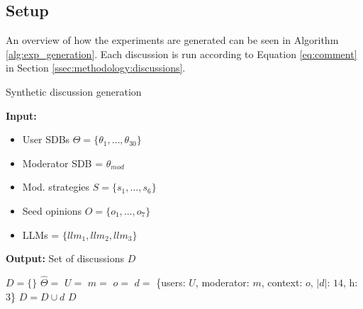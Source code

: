 \subsection{Setup}

An overview of how the experiments are generated can be seen in Algorithm \ref{alg:exp_generation}. Each discussion is run according to Equation \ref{eq:comment} in Section \ref{ssec:methodology:discussions}. 

\begin{algorithm}
\caption{Synthetic discussion generation}
\label{alg:exp_generation}
\hspace*{\algorithmicindent} \textbf{Input:} 
         \begin{itemize}[noitemsep, nosep]
             \item User \acp{SDB} $\Theta = \{\theta_1, \dots, \theta_{30}\}$
             \item Moderator \ac{SDB} = $\theta_{mod}$
             \item Mod. strategies $S = \{s_1, \ldots, s_6\}$
             \item Seed opinions $O = \{o_1, \ldots, o_7\}$
             \item \acp{LLM} = $\{llm_1, llm_2, llm_3\}$
         \end{itemize}
         \hspace*{\algorithmicindent} \textbf{Output:} Set of discussions $D$
\begin{algorithmic}[1]
    \State $D = \{\}$
                \State $\hat{\Theta} = $ 
                \State $U =$  
                \State $m = $ 
                \State $o = $ 
                \State $d =$ \{users: $U$, moderator: $m$, context: $o$, $\vert d \rvert$: $14$, h: $3$\}
                \State $D = D \cup d$
            \EndFor
        \EndFor
    \EndFor
    \State \Return $D$
\end{algorithmic}
\end{algorithm}
